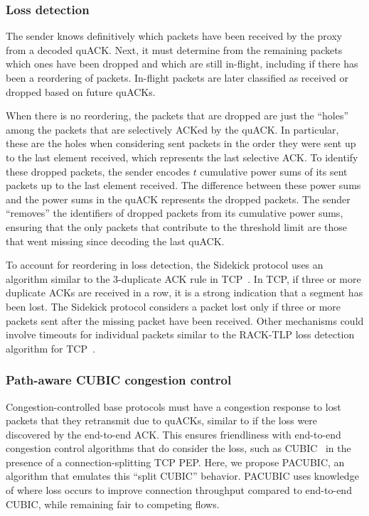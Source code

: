 \subsubsection{Loss detection}

The sender knows definitively which packets have been received by the proxy from
a decoded quACK. Next, it must determine from the remaining packets which ones
have been dropped and which are still in-flight, including if there has been a
reordering of packets. In-flight packets are later classified as received or
dropped based on future quACKs.

When there is no reordering, the packets that are dropped are just the ``holes''
among the packets that are selectively ACKed by the quACK. In particular, these
are the holes when considering sent packets in the order they were sent up to
the last element received, which represents the last selective ACK. To identify
these dropped packets, the sender encodes $t$ cumulative power sums of its sent
packets up to the last element received. The difference between these power
sums and the power sums in the quACK represents the dropped packets. The sender
``removes'' the identifiers of dropped packets from its cumulative power sums,
ensuring that the only packets that contribute to the threshold limit are those
that went missing since decoding the last quACK.

To account for reordering in loss detection, the Sidekick protocol uses an
algorithm similar to the 3-duplicate ACK rule in
TCP~\cite{rfc5681tcp,rfc2001tcp}. In TCP, if three or more duplicate ACKs are
received in a row, it is a strong indication that a segment has been lost. The
Sidekick protocol considers a packet lost only if three or more packets sent
after the missing packet have been received. Other mechanisms could involve
timeouts for individual packets similar to the RACK-TLP loss detection
algorithm for TCP~\cite{rfc8985}.


\subsubsection{Path-aware CUBIC congestion control}

Congestion-controlled base protocols must have a congestion response to lost
packets that they retransmit due to quACKs, similar to if the loss were
discovered by the end-to-end ACK.
This ensures friendliness with end-to-end congestion control algorithms that do
consider the loss, such as CUBIC~\cite{ha2008cubic} in the presence of a
connection-splitting TCP PEP.
Here, we propose PACUBIC, an algorithm that emulates this ``split CUBIC''
behavior. PACUBIC uses knowledge of where loss occurs to improve connection
throughput compared to end-to-end CUBIC, while remaining fair to competing flows.

